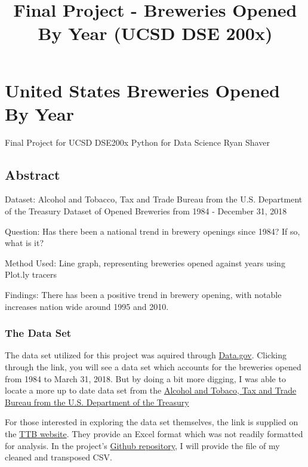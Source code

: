 \documentclass[11pt]{article}
\title{Final Project - Breweries Opened By Year (UCSD DSE 200x)}
\begin{document}
    
    
    \maketitle
    
    

    
    \section{United States Breweries Opened By
Year}\label{united-states-breweries-opened-by-year}

 Final Project for UCSD DSE200x Python for Data Science Ryan Shaver

    \subsection{Abstract}\label{abstract}

Dataset: Alcohol and Tobacco, Tax and Trade Bureau from the U.S.
Department of the Treasury Dataset of Opened Breweries from 1984 -
December 31, 2018

Question: Has there been a national trend in brewery openings since
1984? If so, what is it?

Method Used: Line graph, representing breweries opened against years
using Plot.ly tracers

Findings: There has been a positive trend in brewery opening, with
notable increases nation wide around 1995 and 2010.

    \subsubsection{The Data Set}\label{the-data-set}

The data set utilized for this project was aquired through
\href{https://catalog.data.gov/dataset/brewery-count-by-state-1984-march-31-2018}{Data.gov}.
Clicking through the link, you will see a data set which accounts for
the breweries opened from 1984 to March 31, 2018. But by doing a bit
more digging, I was able to locate a more up to date data set from the
\href{https://www.ttb.gov/foia/frl.shtml}{Alcohol and Tobaco, Tax and
Trade Bureau from the U.S. Department of the Treasury}

For those interested in exploring the data set themselves, the link is
supplied on the
\href{https://www.ttb.gov/foia/count-by-state/q4_brewery_count_by_state_1984_dec2018.xls}{TTB
website}. They provide an Excel format which was not readily formatted
for analysis. In the project's
\href{https://github.com/rshaver/beer_final_ds_ucsd}{Github repository},
I will provide the file of my cleaned and transposed CSV.
\end{document}

